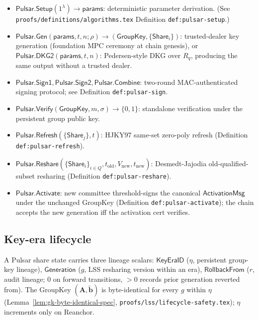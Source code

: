 \documentclass[11pt,a4paper]{article}
\begin{document}
\begin{itemize}[leftmargin=2em,nosep]
  \item $\mathsf{Pulsar.Setup}(1^\lambda) \to \mathsf{params}$: deterministic parameter derivation. (See \texttt{proofs/definitions/algorithms.tex} Definition \texttt{def:pulsar-setup}.)
  \item $\mathsf{Pulsar.Gen}(\mathsf{params}, t, n; \rho) \to (\mathsf{GroupKey}, \{\mathsf{Share}_i\})$: trusted-dealer key generation (foundation MPC ceremony at chain genesis), or $\mathsf{Pulsar.DKG2}(\mathsf{params}, t, n)$: Pedersen-style DKG over $R_q$, producing the same output without a trusted dealer.
  \item $\mathsf{Pulsar.Sign1}, \mathsf{Pulsar.Sign2}, \mathsf{Pulsar.Combine}$: two-round MAC-authenticated signing protocol; see Definition \texttt{def:pulsar-sign}.
  \item $\mathsf{Pulsar.Verify}(\mathsf{GroupKey}, m, \sigma) \to \{0, 1\}$: standalone verification under the persistent group public key.
  \item $\mathsf{Pulsar.Refresh}(\{\mathsf{Share}_j\}, t)$: HJKY97 same-set zero-poly refresh (Definition \texttt{def:pulsar-refresh}).
  \item $\mathsf{Pulsar.Reshare}(\{\mathsf{Share}_i\}_{i \in Q}, t_{\mathrm{old}}, V_{\mathrm{new}}, t_{\mathrm{new}})$: Desmedt-Jajodia old-qualified-subset resharing (Definition \texttt{def:pulsar-reshare}).
  \item $\mathsf{Pulsar.Activate}$: new committee threshold-signs the canonical $\mathsf{ActivationMsg}$ under the unchanged GroupKey (Definition \texttt{def:pulsar-activate}); the chain accepts the new generation iff the activation cert verifies.
\end{itemize}

\subsection{Key-era lifecycle}

A Pulsar share state carries three lineage scalars: $\mathsf{KeyEraID}$ ($\eta$, persistent group-key lineage), $\mathsf{Generation}$ ($g$, LSS resharing version within an era), $\mathsf{RollbackFrom}$ ($r$, audit lineage; $0$ on forward transitions, $> 0$ records prior generation reverted from). The GroupKey $(\mathbf{A}, \tilde{\mathbf{b}})$ is byte-identical for every $g$ within $\eta$ (Lemma~\ref{lem:gk-byte-identical-spec}, \texttt{proofs/lss/lifecycle-safety.tex}); $\eta$ increments only on Reanchor.
\end{document}
